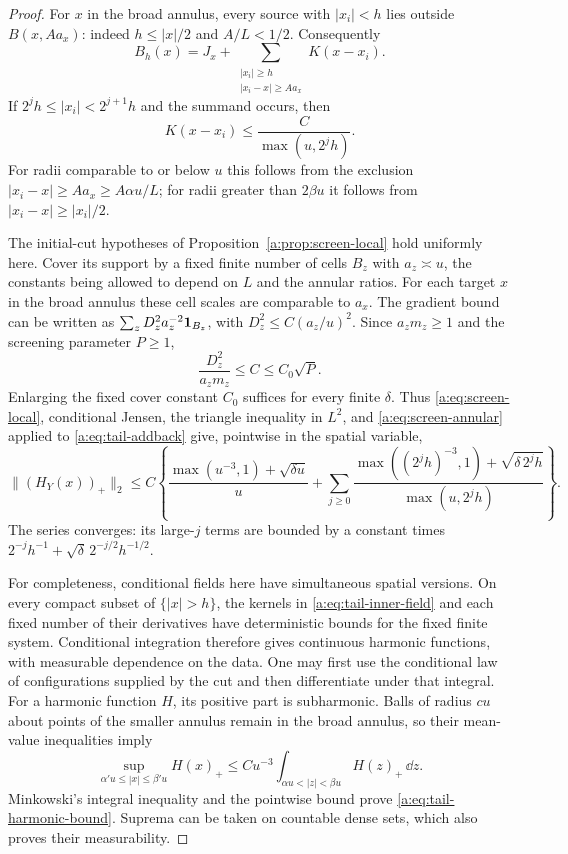 \begin{proof}
For $x$ in the broad annulus, every source with $|x_i|<h$ lies outside
$B(x,Aa_x)$: indeed $h\le|x|/2$ and $A/L<1/2$.  Consequently
\begin{equation}\label{a:eq:tail-addback}
 B_h(x)=J_x+
 \sum_{\substack{|x_i|\ge h\\|x_i-x|\ge Aa_x}}K(x-x_i).
\end{equation}
If $2^jh\le|x_i|<2^{j+1}h$ and the summand occurs, then
\[
 K(x-x_i)\le\frac{C}{\max(u,2^jh)}.
\]
For radii comparable to or below $u$ this follows from the exclusion
$|x_i-x|\ge Aa_x\ge A\alpha u/L$; for radii greater than $2\beta u$ it
follows from $|x_i-x|\ge|x_i|/2$.

The initial-cut hypotheses of Proposition~\ref{a:prop:screen-local} hold
uniformly here.  Cover its support by a fixed finite number of cells
$B_z$ with $a_z\asymp u$, the constants being allowed to depend on $L$
and the annular ratios.  For each target $x$ in the broad annulus these
cell scales are comparable to $a_x$.  The gradient bound can be written
as $\sum_zD_z^2a_z^{-2}\mathbf 1_{B_z}$, with $D_z^2\le C(a_z/u)^2$.
Since $a_zm_z\ge1$ and the screening parameter $P\ge1$,
\[
 \frac{D_z^2}{a_zm_z}\le C\le C_0\sqrt P.
\]
Enlarging the fixed cover constant $C_0$ suffices for every finite
$\delta$.
Thus \eqref{a:eq:screen-local}, conditional Jensen, the triangle inequality
in $L^2$, and \eqref{a:eq:screen-annular} applied to \eqref{a:eq:tail-addback}
give, pointwise in the spatial variable,
\[
 \|(H_Y(x))_+\|_2\le C\left\{
 \frac{\max(u^{-3},1)+\sqrt{\delta u}}{u}
 +\sum_{j\ge0}
 \frac{\max((2^jh)^{-3},1)+\sqrt{\delta\,2^jh}}
      {\max(u,2^jh)}\right\}.
\]
The series converges: its large-$j$ terms are bounded by a constant
times $2^{-j}h^{-1}+\sqrt\delta\,2^{-j/2}h^{-1/2}$.

For completeness, conditional fields here have simultaneous spatial
versions.  On every compact subset of $\{|x|>h\}$, the kernels in
\eqref{a:eq:tail-inner-field} and each fixed number of their derivatives
have deterministic bounds for the fixed finite system.  Conditional
integration therefore gives continuous harmonic functions, with
measurable dependence on the data.  One may first use the conditional
law of configurations supplied by the cut and then differentiate under
that integral.  For a harmonic function $H$, its positive part is
subharmonic.  Balls of radius $c u$ about points of the smaller annulus
remain in the broad annulus, so their mean-value inequalities imply
\[
 \sup_{\alpha'u\le|x|\le\beta'u}H(x)_+
 \le C u^{-3}\int_{\alpha u<|z|<\beta u}H(z)_+\,\dd z.
\]
Minkowski's integral inequality and the pointwise bound prove
\eqref{a:eq:tail-harmonic-bound}.  Suprema can be taken on countable dense
sets, which also proves their measurability.
\end{proof}

